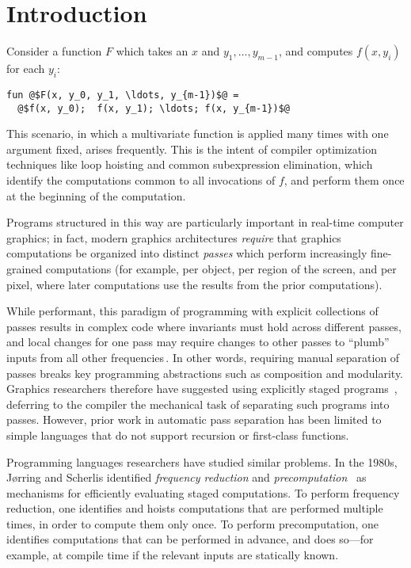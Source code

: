 \section{Introduction}

Consider a function $F$ which takes an $x$ and $y_1,\dots,y_{m-1}$, and computes
$f(x,y_i)$ for each $y_i$:
\begin{lstlisting}
fun @$F(x, y_0, y_1, \ldots, y_{m-1})$@ = 
  @$f(x, y_0);  f(x, y_1); \ldots; f(x, y_{m-1})$@
\end{lstlisting}
%
This scenario, in which a multivariate function is applied many times with one
argument fixed, arises frequently. 
This is the intent of compiler optimization techniques like loop hoisting and
common subexpression elimination, which identify the computations common to all
invocations of $f$, and perform them once at the beginning of the computation.

Programs structured in this way are particularly important in real-time computer
graphics; in fact, modern graphics architectures \emph{require} that graphics
computations be organized into distinct {\em passes} which perform increasingly
fine-grained computations (for example, per object, per region of the screen,
and per pixel, where later computations use the results from the prior
computations).

While performant, this paradigm of programming with explicit collections of
passes results in complex code where invariants must hold across different
passes, and local changes for one pass may require changes to other passes to
``plumb'' inputs from all other frequencies\,\cite{Foley:2011}.
%
In other words, requiring manual separation of passes breaks key programming
abstractions such as composition and modularity.
%
Graphics researchers therefore have suggested using explicitly staged programs
\,\cite{Proudfoot:2001,Foley:2011,He:2014}, deferring to the compiler the
mechanical task of separating such programs into passes. However, prior work in
automatic pass separation has been limited to simple languages that do not
support recursion or first-class functions.

Programming languages researchers have studied similar problems. In the 1980s,
J{\o}rring and Scherlis identified {\em frequency reduction} and {\em
precomputation}~\cite{JS86-staging} as mechanisms for efficiently evaluating
staged computations. To perform frequency reduction, one identifies and hoists
computations that are performed multiple times, in order to compute them only
once. To perform precomputation, one identifies computations that can be
performed in advance, and does so---for example, at compile time if the relevant
inputs are statically known.

